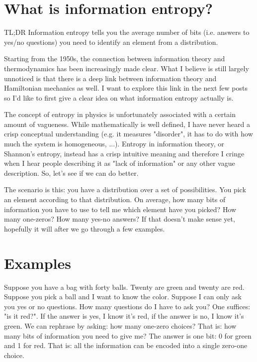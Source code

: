 \documentclass[aps,pra,10pt,floatfix,nofootinbib]{revtex4-1}
\theoremstyle{definition}
\begin{document}
	
\section{What is information entropy?}

TL;DR Information entropy tells you the average number of bits (i.e. answers to yes/no questions) you need to identify an element from a distribution.

Starting from the 1950s, the connection between information theory and thermodynamics has been increasingly made clear. What I believe is still largely unnoticed is that there is a deep link between information theory and Hamiltonian mechanics as well. I want to explore this link in the next few posts so I'd like to first give a clear idea on what information entropy actually is.

The concept of entropy in physics is unfortunately associated with a certain amount of vagueness. While mathematically is well defined, I have never heard a crisp conceptual understanding (e.g. it measures "disorder", it has to do with how much the system is homogeneous, ...). Entropy in information theory, or Shannon's entropy, instead has a crisp intuitive meaning and therefore I cringe when I hear people describing it as "lack of information" or any other vague description. So, let's see if we can do better.

The scenario is this: you have a distribution over a set of possibilities. You pick an element according to that distribution. On average, how many bits of information you have to use to tell me which element have you picked? How many one-zeros? How many yes-no answers? If that doesn't make sense yet, hopefully it will after we go through a few examples.

\section{Examples}

Suppose you have a bag with forty balls. Twenty are green and twenty are red. Suppose you pick a ball and I want to know the color. Suppose I can only ask you yes or no questions. How many questions do I have to ask you? One suffices: "is it red?". If the answer is yes, I know it's red, if the answer is no, I know it's green. We can rephrase by asking: how many one-zero choices? That is: how many bits of information you need to give me? The answer is one bit: 0 for green and 1 for red. That is: all the information can be encoded into a single zero-one choice.
\end{document}
